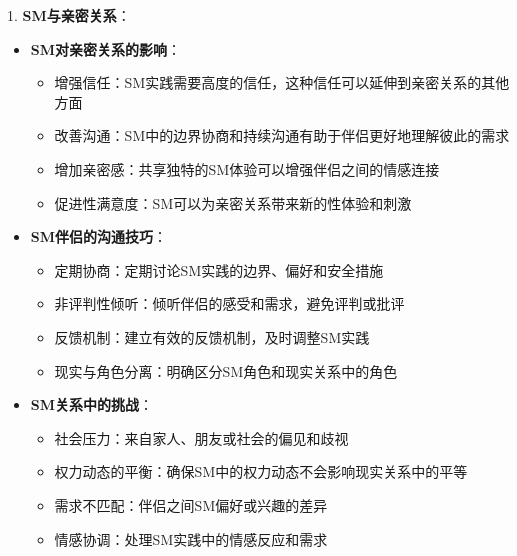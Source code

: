 \documentclass[12pt,UTF8]{ctexbook}
\begin{document}
1. \textbf{SM与亲密关系}：
  \begin{itemize}
  \item \textbf{SM对亲密关系的影响}：
    \begin{itemize}
    \item 增强信任：SM实践需要高度的信任，这种信任可以延伸到亲密关系的其他方面
    \item 改善沟通：SM中的边界协商和持续沟通有助于伴侣更好地理解彼此的需求
    \item 增加亲密感：共享独特的SM体验可以增强伴侣之间的情感连接
    \item 促进性满意度：SM可以为亲密关系带来新的性体验和刺激
    \end{itemize}
  \item \textbf{SM伴侣的沟通技巧}：
    \begin{itemize}
    \item 定期协商：定期讨论SM实践的边界、偏好和安全措施
    \item 非评判性倾听：倾听伴侣的感受和需求，避免评判或批评
    \item 反馈机制：建立有效的反馈机制，及时调整SM实践
    \item 现实与角色分离：明确区分SM角色和现实关系中的角色
    \end{itemize}
  \item \textbf{SM关系中的挑战}：
    \begin{itemize}
    \item 社会压力：来自家人、朋友或社会的偏见和歧视
    \item 权力动态的平衡：确保SM中的权力动态不会影响现实关系中的平等
    \item 需求不匹配：伴侣之间SM偏好或兴趣的差异
    \item 情感协调：处理SM实践中的情感反应和需求
    \end{itemize}
  \end{itemize}
\end{document}

